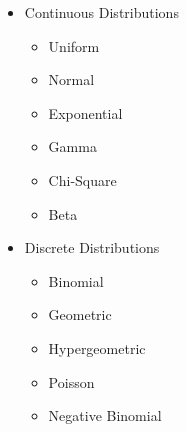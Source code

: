 \documentclass{article}
\begin{document}
\begin{itemize}
  \item Continuous Distributions
    \begin{itemize}
      \item Uniform
      \item Normal
      \item Exponential
      \item Gamma
      \item Chi-Square
      \item Beta
    \end{itemize}
  \item Discrete Distributions
    \begin{itemize}
      \item Binomial
      \item Geometric
      \item Hypergeometric
      \item Poisson
      \item Negative Binomial
    \end{itemize}
\end{itemize}
\end{document}
